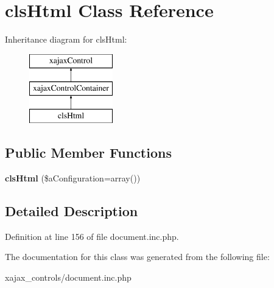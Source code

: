 \hypertarget{classclsHtml}{
\section{clsHtml Class Reference}
\label{classclsHtml}
}
Inheritance diagram for clsHtml:\begin{figure}[H]
\begin{center}
\leavevmode
\includegraphics[height=3.000000cm]{classclsHtml}
\end{center}
\end{figure}
\subsection*{Public Member Functions}
\begin{DoxyCompactItemize}
\item 
\hypertarget{classclsHtml_a6bc277465cfaa9bc8086101bcd41780d}{
{\bfseries clsHtml} (\$aConfiguration=array())}
\label{classclsHtml_a6bc277465cfaa9bc8086101bcd41780d}

\end{DoxyCompactItemize}


\subsection{Detailed Description}


Definition at line 156 of file document.inc.php.



The documentation for this class was generated from the following file:\begin{DoxyCompactItemize}
\item 
xajax\_\-controls/document.inc.php\end{DoxyCompactItemize}
